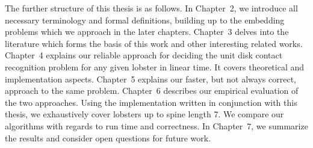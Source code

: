 The further structure of this thesis is as follows.
In Chapter~2, we introduce all necessary terminology and formal definitions, building up to the embedding problems which we approach in the later chapters.
Chapter~3 delves into the literature which forms the basis of this work and other interesting related works.
Chapter~4 explains our reliable approach for deciding the unit disk contact recognition problem for any given lobster in linear time. It covers theoretical and implementation aspects.
Chapter~5 explains our faster, but not always correct, approach to the same problem.
Chapter~6 describes our empirical evaluation of the two approaches. Using the implementation written in conjunction with this thesis, we exhaustively cover lobsters up to spine length 7. We compare our algorithms with regards to run time and correctness.
In Chapter~7, we summarize the results and consider open questions for future work.
